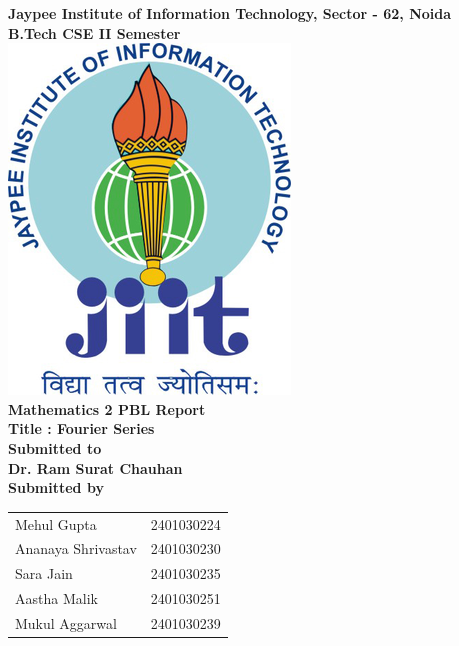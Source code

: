 \documentclass[12pt,a4paper]{article}
\begin{document}
\begin{titlepage}
    \centering
    \Huge
    \textbf{Jaypee Institute of Information Technology, Sector - 62, Noida} \\
    \vspace{0.5cm}
    \Large
    \textbf{B.Tech CSE II Semester} \\
    \vspace{1cm}
    \vspace*{\fill}
    \includegraphics[scale=2]{jiit_logo} \\
    \vspace{1.5cm}
    \Huge
    \textbf{Mathematics 2 PBL Report} \\
    \Large
    \textbf{Title : Fourier Series} \\
    \vspace{1cm}
    \Large
    \textbf{Submitted to} \\
    \textbf{Dr. Ram Surat Chauhan}\\
    \vspace{1cm}
    \textbf{Submitted by} \\
    \vspace{0.5cm}
    \begin{tabular}{ll}
        Mehul Gupta & 2401030224 \\
        Ananaya Shrivastav & 2401030230 \\
        Sara Jain & 2401030235 \\
        Aastha Malik & 2401030251 \\
        Mukul Aggarwal & 2401030239 \\
    \end{tabular}
    \vspace*{\fill}
    \normalsize
\end{titlepage}
\end{document}
